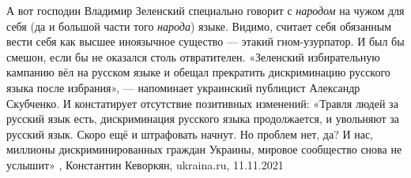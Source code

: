 А вот господин Владимир Зеленский специально говорит с \emph{народом} на чужом
для себя (да и большой части того \emph{народа}) языке. Видимо, считает себя
обязанным вести себя как высшее иноязычное существо — этакий гном-узурпатор. И
был бы смешон, если бы не оказался столь отвратителен.  «Зеленский
избирательную кампанию вёл на русском языке и обещал прекратить дискриминацию
русского языка после избрания», — напоминает украинский публицист Александр
Скубченко. И констатирует отсутствие позитивных изменений: «Травля людей за
русский язык есть, дискриминация русского языка продолжается, и увольняют за
русский язык. Скоро ещё и штрафовать начнут. Но проблем нет, да? И нас,
миллионы дискриминированных граждан Украины, мировое сообщество снова не
услышит»
, 
Константин Кеворкян, ukraina.ru, 11.11.2021

